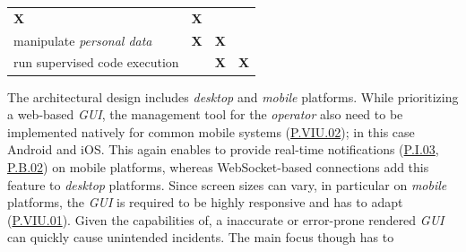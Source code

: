 \documentclass[12pt,english,a4paper,titlepage,cleardoublepage=empty,dottedtoc]{report}
\begin{document}
\begin{longtable}[]{@{}lccc@{}}
\begin{minipage}[t]{0.12\columnwidth}
\textbf{X}\strut
\end{minipage} & \begin{minipage}[t]{0.12\columnwidth}\centering\strut
\textbf{X}\strut
\end{minipage}\tabularnewline
\begin{minipage}[t]{0.24\columnwidth}\raggedright\strut
manipulate \emph{personal data}\strut
\end{minipage} & \begin{minipage}[t]{0.24\columnwidth}\centering\strut
\textbf{X}\strut
\end{minipage} & \begin{minipage}[t]{0.24\columnwidth}\centering\strut
\textbf{X}\strut
\end{minipage} & \begin{minipage}[t]{0.24\columnwidth}\centering\strut
\strut
\end{minipage}\tabularnewline
\begin{minipage}[t]{0.24\columnwidth}\raggedright\strut
run supervised code execution\strut
\end{minipage} & \begin{minipage}[t]{0.24\columnwidth}\centering\strut
\strut
\end{minipage} & \begin{minipage}[t]{0.24\columnwidth}\centering\strut
\textbf{X}\strut
\end{minipage} & \begin{minipage}[t]{0.24\columnwidth}\centering\strut
\textbf{X}\strut
\end{minipage}\tabularnewline
\bottomrule
\end{longtable}

The architectural design includes \emph{desktop} and \emph{mobile}
platforms. While prioritizing a web-based \emph{GUI}, the management
tool for the \emph{operator} also need to be implemented natively for
common mobile systems (\protect\hyperlink{pviu02}{P.VIU.02}); in this
case Android and iOS. This again enables to provide real-time
notifications (\protect\hyperlink{pi03}{P.I.03},
\protect\hyperlink{pb02}{P.B.02}) on mobile platforms, whereas
WebSocket-based connections add this feature to \emph{desktop}
platforms. Since screen sizes can vary, in particular on \emph{mobile}
platforms, the \emph{GUI} is required to be highly responsive and has to
adapt (\protect\hyperlink{pviu01}{P.VIU.01}). Given the capabilities of,
a inaccurate or error-prone rendered \emph{GUI} can quickly cause
unintended incidents. The main focus though has to
\end{document}
